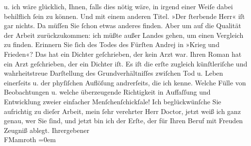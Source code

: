 \begin{ledgroupsized}[t]{13cm}
               u. ich wäre glücklich, Ihnen, falls dies nötig wäre, in irgend einer Weiſe dabei
               behilflich ſein zu können. Und mit einem anderen Titel. »Der ſterbende Herr« iſt gar nichts. Da müſſen Sie ſchon etwas
               anderes finden. Aber um auf die Qualität der Arbeit zurückzukommen: ich müßte außer
               Landes gehen, um einen Vergleich zu finden. Erinnern Sie ſich des Todes des Fürſten
               Andrej in »Krieg und Frieden«? Das hat ein Dichter geſchrieben, der kein
               Arzt war. Ihren Roman hat ein Arzt geſchrieben, der ein Dichter iſt. Es iſt die erſte
               zugleich künſtleriſche und wahrheitstreue Darſtellung des Grundverhältniſſes zwiſchen
               Tod u. Leben einerſeits u. der phyſiſchen Auflöſung andrerſeits, die ich kenne.
               Welche Fülle von Beobachtungen u. welche überzeugende Richtigkeit in Auffaſſung und
               Entwicklung zweier einfacher Menſchenſchickſale! Ich beglückwünſche Sie aufrichtig zu
               dieſer Arbeit, mein ſehr verehrter Herr Doctor, jetzt weiß ich ganz genau, wer Sie
               ſind, und jetzt bin ich der Erſte, der für Ihren Beruf mit Freuden Zeugniß
               ablegt.\pend
           \pstart
           Ihr\hspace*{1.5em}ergebener{\\[\baselineskip]}\spacefill\mbox{FMamroth}\pend
           \leftskip=0em{}
         
         \endnumbering{}\end{ledgroupsized}  \newcommand{\dateiname}{L00186}\newcommand{\titel}{Fedor Mamroth an Arthur Schnitzler, 5. 3. 1893}\newcommand{\editorInnen}{Martin Anton Müller und Gerd-Hermann Susen}
      
